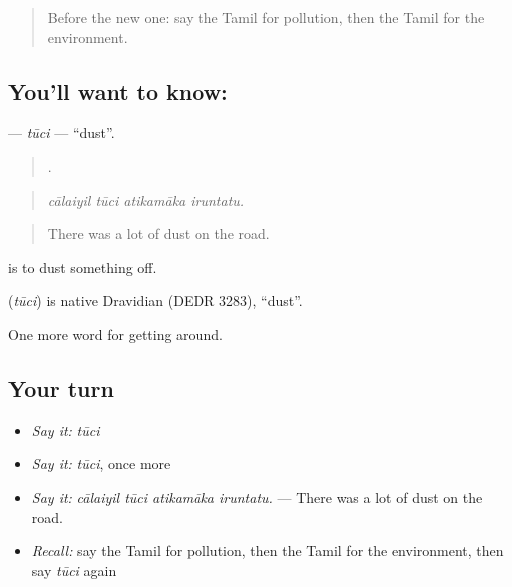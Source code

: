 \label{lesson:TA-C440-tuci}



\begin{quote}
Before the new one: say the Tamil for pollution, then the Tamil for the environment.
\end{quote}

\subsection*{You'll want to know: }
\textbf{} — \emph{tūci} — \textquotedblleft{}dust\textquotedblright{}.

\begin{quote}
   .
\end{quote}

\begin{quote}
\emph{cālaiyil tūci atikamāka iruntatu.}
\end{quote}

\begin{quote}
There was a lot of dust on the road.
\end{quote}

  is to dust something off.

\begin{cousinweb}
\textbf{} (\emph{tūci}) is native Dravidian (DEDR 3283), \textquotedblleft{}dust\textquotedblright{}.
\end{cousinweb}

\begin{grammarlens}[title={What you've built}]
One more word for getting around.
\end{grammarlens}

\subsection*{Your turn}
\begin{itemize}
\raggedright
  \item \emph{Say it:} \emph{tūci}
  \item \emph{Say it:} \emph{tūci}, once more
  \item \emph{Say it:} \emph{cālaiyil tūci atikamāka iruntatu.} — There was a lot of dust on the road.
  \item \emph{Recall:} say the Tamil for pollution, then the Tamil for the environment, then say \emph{tūci} again
\end{itemize}

